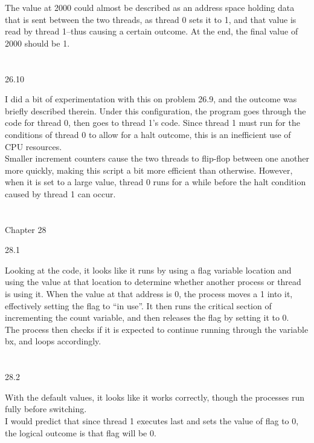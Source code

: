 \documentclass[12pt, a4paper]{article}
\begin{document}
	The value at 2000 could almost be described as an address space holding data that is sent between the two threads, as thread 0 sets it to 1, and that value is read by thread 1--thus causing a certain outcome. At the end, the final value of 2000 should be 1. \\ \\ \\

26.10
	
	I did a bit of experimentation with this on problem 26.9, and the outcome was briefly described therein. Under this configuration, the program goes through the code for thread 0, then goes to thread 1's code. Since thread 1 must run for the conditions of thread 0 to allow for a halt outcome, this is an inefficient use of CPU resources.\\
	
	Smaller increment counters cause the two threads to flip-flop between one another more quickly, making this script a bit more efficient than otherwise. However, when it is set to a large value, thread 0 runs for a while before the halt condition caused by thread 1 can occur.  \\ \\ \\


\noindent
Chapter 28

28.1

	Looking at the code, it looks like it runs by using a flag variable location and using the value at that location to determine whether another process or thread is using it. When the value at that address is 0, the process moves a 1 into it, effectively setting the flag to ``in use''. It then runs the critical section of incrementing the count variable, and then releases the flag by setting it to 0. \\
	
	The process then checks if it is expected to continue running through the variable bx, and loops accordingly.  \\ \\ \\
	

28.2

	With the default values, it looks like it works correctly, though the processes run fully before switching.\\
	
	I would predict that since thread 1 executes last and sets the value of flag to 0, the logical outcome is that flag will be 0. \\ \\ \\
\end{document}
